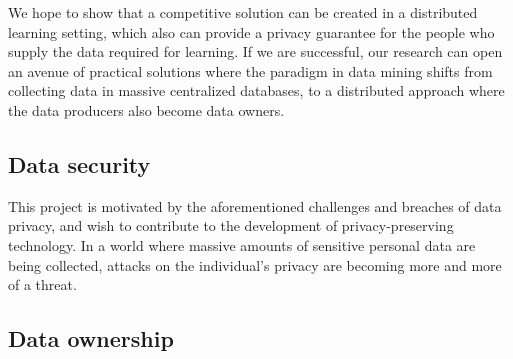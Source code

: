 We hope to show that a competitive solution can be created in a distributed learning setting, which also can provide a privacy guarantee for the people who supply the data required for learning. If we are successful, our research can open an avenue of practical solutions where the paradigm in data mining shifts from collecting data in massive centralized databases, to a distributed approach where the data producers also become data owners.

\subsection{Data security}
This project is motivated by the aforementioned challenges and breaches of data privacy, and wish to contribute to the development of privacy-preserving technology. In a world where massive amounts of sensitive personal data are being collected, attacks on the individual's privacy are becoming more and more of a threat.

\subsection{Data ownership}
\label{sec:motivation_data_ownership}

